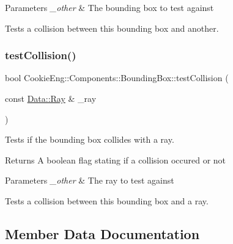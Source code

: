\begin{DoxyParams}{Parameters}
{\em \+\_\+other} & The bounding box to test against\\
\hline
\end{DoxyParams}
Tests a collision between \textquotesingle{}this\textquotesingle{} bounding box and another. \mbox{\label{class_cookie_eng_1_1_components_1_1_bounding_box_aebb0d8b30c7d24d9617b391434205769}} 
\subsubsection{\texorpdfstring{test\+Collision()}{testCollision()}\hspace{0.1cm}{\footnotesize\ttfamily [2/2]}}
{\footnotesize\ttfamily bool Cookie\+Eng\+::\+Components\+::\+Bounding\+Box\+::test\+Collision (\begin{DoxyParamCaption}\item[{const \hyperlink{struct_cookie_eng_1_1_data_1_1_ray}{Data\+::\+Ray} \&}]{\+\_\+ray }\end{DoxyParamCaption})}



Tests if the bounding box collides with a ray. 

\begin{DoxyReturn}{Returns}
A boolean flag stating if a collision occured or not 
\end{DoxyReturn}

\begin{DoxyParams}{Parameters}
{\em \+\_\+other} & The ray to test against\\
\hline
\end{DoxyParams}
Tests a collision between \textquotesingle{}this\textquotesingle{} bounding box and a ray. 

\subsection{Member Data Documentation}
\mbox{\label{class_cookie_eng_1_1_components_1_1_bounding_box_a2075e00805e700e3b24abe83dd26008c}} 
